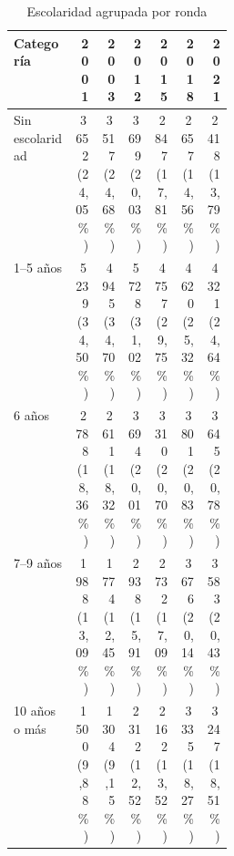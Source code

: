 \begin{table}[!htbp]
\centering
\caption{Escolaridad agrupada por ronda}\label{tab:cp1-edu-gru}
\small\setlength{\tabcolsep}{4pt}
\renewcommand{\arraystretch}{1.15}
\begin{tabular}{p{0.28\linewidth}rrrrrr}
\toprule
\textbf{Categoría} & \textbf{2001} & \textbf{2003} & \textbf{2012} & \textbf{2015} & \textbf{2018} & \textbf{2021} \\
\midrule
Sin escolaridad & \shortstack[r]{3\,652\\(24,05\%)} & \shortstack[r]{3\,517\\(24,68\%)} & \shortstack[r]{3\,699\\(20,03\%)} & \shortstack[r]{2\,847\\(17,81\%)} & \shortstack[r]{2\,657\\(14,56\%)} & \shortstack[r]{2\,418\\(13,79\%)} \\
1--5 años & \shortstack[r]{5\,239\\(34,50\%)} & \shortstack[r]{4\,945\\(34,70\%)} & \shortstack[r]{5\,728\\(31,02\%)} & \shortstack[r]{4\,757\\(29,75\%)} & \shortstack[r]{4\,620\\(25,32\%)} & \shortstack[r]{4\,321\\(24,64\%)} \\
6 años & \shortstack[r]{2\,788\\(18,36\%)} & \shortstack[r]{2\,611\\(18,32\%)} & \shortstack[r]{3\,694\\(20,01\%)} & \shortstack[r]{3\,310\\(20,70\%)} & \shortstack[r]{3\,801\\(20,83\%)} & \shortstack[r]{3\,645\\(20,78\%)} \\
7--9 años & \shortstack[r]{1\,988\\(13,09\%)} & \shortstack[r]{1\,774\\(12,45\%)} & \shortstack[r]{2\,938\\(15,91\%)} & \shortstack[r]{2\,732\\(17,09\%)} & \shortstack[r]{3\,676\\(20,14\%)} & \shortstack[r]{3\,583\\(20,43\%)} \\
10 años o más & \shortstack[r]{1\,500\\(9,88\%)} & \shortstack[r]{1\,304\\(9,15\%)} & \shortstack[r]{2\,312\\(12,52\%)} & \shortstack[r]{2\,162\\(13,52\%)} & \shortstack[r]{3\,335\\(18,27\%)} & \shortstack[r]{3\,247\\(18,51\%)} \\

\end{tabular}
\end{table}
